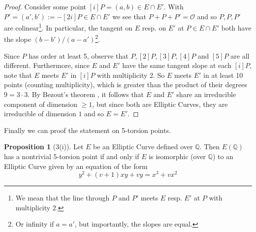 \documentclass{scrartcl}
\newcommand{\Q}{\mathbb{Q}}
\renewcommand{\O}{\mathcal{O}}
\theoremstyle{definition}
\newtheorem{prop}[subsection]{Proposition}
\begin{document}
\begin{proof}
    Consider some point $[i] P = (a, b) \in E \cap E'$.
    With $P' = (a', b') := -[2i] P \in E \cap E'$ we see that $P + P + P' = \O$ and so $P, P, P'$ are colinear\footnote{We mean that the line through $P$ and $P'$ meets $E$ resp. $E'$ at $P$ with multiplicity 2.}.
    In particular, the tangent on $E$ resp. on $E'$ at $P \in E \cap E'$ both have the slope $(b - b')/(a - a')$\footnote{Or infinity if $a = a'$, but importantly, the slopes are equal.}.

    Since $P$ has order at least 5, observe that $P, [2]P, [3]P, [4]P$ and $[5]P$ are all different.
    Furthermore, since $E$ and $E'$ have the same tangent slope at each $[i] P$, note that $E$ meets $E'$ in $[i] P$ with multiplicity 2.
    So $E$ meets $E'$ in at least 10 points (counting multiplicity), which is greater than the product of their degrees $9 = 3 \cdot 3$.
    By Bezout's theorem \cite[Corollary I.7.8]{hartshorne}, it follows that $E$ and $E'$ share an irreducible component of dimension $\geq 1$, but since both are Elliptic Curves, they are irreducible of dimension $1$ and so $E = E'$.
\end{proof}
Finally we can proof the statement on 5-torsion points.
\begin{prop}[3(i)]
    Let $E$ be an Elliptic Curve defined over $\Q$.
    Then $E(\Q)$ has a nontrivial 5-torsion point if and only if $E$ is isomorphic (over $\Q$) to an Elliptic Curve given by an equation of the form
    \begin{equation*}
        y^2 + (v + 1)x y + v y = x^3 + v x^2
    \end{equation*}
\end{prop}
\end{document}

